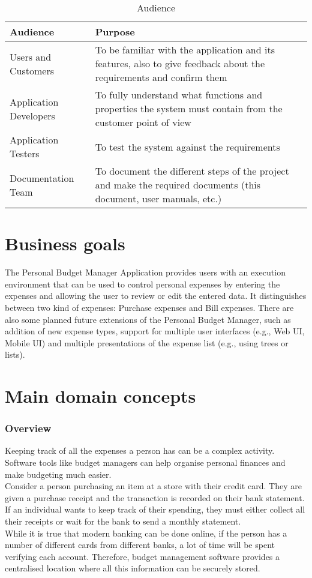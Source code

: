 \documentclass[12pt]{article}
\begin{document}
\begin{table}[htbp]
\caption{Audience}
\begin{center}
\begin{tabular}{|l | p{10 cm}|}
\hline
Audience & Purpose \\
\hline\hline
Users and Customers & To be familiar with the application and its features, also to give feedback about the requirements and confirm them\\
\hline
Application Developers & To fully understand what functions and properties the system must                    
contain from the customer point of view\\
\hline
Application Testers & To test the system against the requirements\\
\hline
Documentation Team&To document the different steps of the project and make the required documents (this document, user manuals, etc.)\\
\hline
\end{tabular}
\end{center}
\end{table}

 
\section{Business goals} \label{buisGoals}
The Personal Budget Manager Application provides users with an execution environment that can be used to 
control personal expenses by entering the expenses and allowing the user to review or edit the entered data. 
It distinguishes between two kind of expenses: Purchase expenses and Bill expenses. There are also some planned future 
extensions of the Personal Budget Manager, such as addition of new expense types, support for multiple user interfaces (e.g., Web UI, Mobile UI) and multiple presentations of the expense list (e.g., using trees or lists).

\section{Main domain concepts} \label{domCon}
\subsubsection{Overview}
Keeping track of all the expenses a person has can be a complex activity. Software tools like budget managers can help organise personal finances and make budgeting much easier. \\
Consider a person purchasing an item at a store with their credit card. They are given a purchase receipt and the transaction is recorded on their bank statement. If an individual wants to keep track of their spending, they must either collect all their receipts or wait for the bank to send a monthly statement. \\
While it is true that modern banking can be done online, if the person has a number of different cards from different banks, a lot of time will be spent verifying each account. Therefore, budget management software provides a centralised location where all this information can be securely stored.
\end{document}

